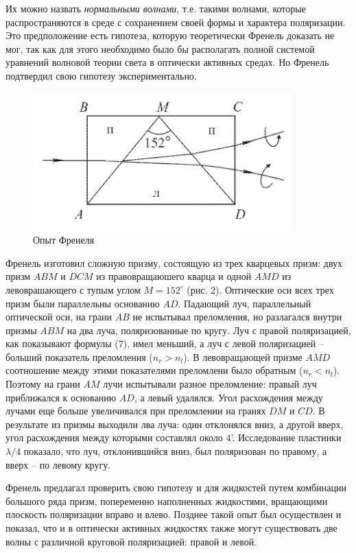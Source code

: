 \documentclass[14pt]{article}
\begin{document}
Их можно назвать \textsl{нормальными волнами}, т.е. такими волнами, которые распространяются в среде с сохранением своей формы и характера поляризации. Это предположение есть гипотеза, которую теоретически Френель доказать не мог, так как для этого необходимо было бы располагать полной системой уравнений волновой теории света в оптически активных средах. Но Френель подтвердил свою гипотезу экспериментально.

\begin{figure}
\centering
	\includegraphics[width=10cm]{2}
	\caption{Опыт Френеля}
\end{figure}

Френель изготовил сложную призму, состоящую из трех кварцевых призм: двух призм $ABM$ и $DCM$ из правовращаюшего кварца и одной $AMD$ из левоврашающего с тупым углом 
$M = 152^\circ$ (рис. 2). Оптические оси всех трех призм были параллельны основанию $AD$. Падающий луч, параллельный оптической оси, на грани $AB$ не испытывал преломления, но разлагался внутри призмы $ABM$ на два луча, поляризованные по кругу. Луч с правой поляризацией, как показывают формулы (7), имел меньший, а луч с левой поляризацией -- больший показатель преломления ($n_r > n_l$). В левовращающей призме $AMD$ соотношение между этими показателями преломлени было обратным ($n_r < n_l$). Поэтому на грани $AM$ лучи испытывали разное преломление: правый луч приближался к основанию $AD$, а левый удалялся. Угол расхождения между лучами еще больше увеличивался при преломлении на гранях $DM$ и $CD$. В результате из призмы выходили лва луча: один отклонялся вниз, а другой вверх, угол расхождения между которыми составлял около 4’. Исследование пластинки $\lambda/4$ показало, что луч, отклонившийся вниз, был поляризован по правому, а вверх -- по левому кругу.

Френель предлагал проверить свою гипотезу и для жидкостей путем комбинации большого ряда призм, попеременно наполненных жидкостями, вращающими плоскость поляризации вправо и влево. Позднее такой опыт был осуществлен и показал, что и в оптически активных жидкостях также могут существовать две волны с различной круговой поляризацией: правой и левой.
\end{document}
